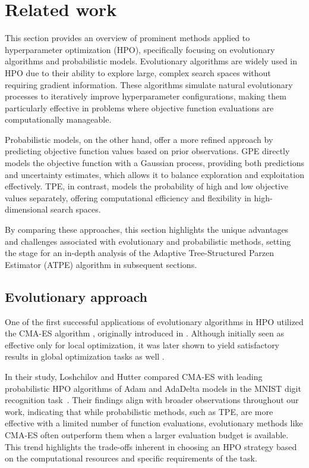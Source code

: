 \section{Related work}
This section provides an overview of prominent methods applied to hyperparameter optimization (HPO), specifically focusing on evolutionary algorithms and probabilistic models. Evolutionary algorithms are widely used in HPO due to their ability to explore large, complex search spaces without requiring gradient information. These algorithms simulate natural evolutionary processes to iteratively improve hyperparameter configurations, making them particularly effective in problems where objective function evaluations are computationally manageable.

Probabilistic models, on the other hand, offer a more refined approach by predicting objective function values based on prior observations. GPE directly models the objective function with a Gaussian process, providing both predictions and uncertainty estimates, which allows it to balance exploration and exploitation effectively. TPE, in contrast, models the probability of high and low objective values separately, offering computational efficiency and flexibility in high-dimensional search spaces.

By comparing these approaches, this section highlights the unique advantages and challenges associated with evolutionary and probabilistic methods, setting the stage for an in-depth analysis of the Adaptive Tree-Structured Parzen Estimator (ATPE) algorithm in subsequent sections.

\subsection{Evolutionary approach}

One of the first successful applications of evolutionary algorithms in HPO utilized the CMA-ES algorithm \cite{loshchilov2016cmaes}, originally introduced in \cite{6790628}. Although initially seen as effective only for local optimization, it was later shown to yield satisfactory results in global optimization tasks as well \cite{10.1007/978-3-540-30217-9_36}.

In their study, Loshchilov and Hutter \cite{loshchilov2016cmaes} compared CMA-ES with leading probabilistic HPO algorithms of Adam and AdaDelta models in the MNIST digit recognition task~\cite{mnist}. Their findings align with broader observations throughout our work, indicating that while probabilistic methods, such as TPE, are more effective with a limited number of function evaluations, evolutionary methods like CMA-ES often outperform them when a larger evaluation budget is available. This trend highlights the trade-offs inherent in choosing an HPO strategy based on the computational resources and specific requirements of the task.

